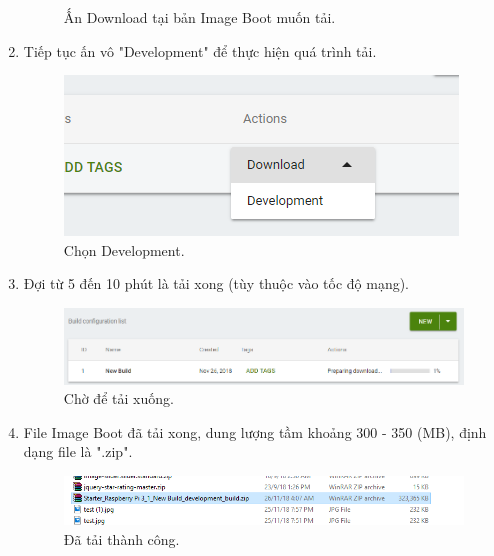 \begin{enumerate}
\begin{center}
\begin{figure}[htp]
\begin{center}
\end{center}
\caption{Ấn Download tại bản Image Boot muốn tải.}
\label{refhinh1}
\end{figure}
\end{center}
\newpage
\item Tiếp tục ấn vô "Development" để thực hiện quá trình tải.
\begin{center}
\begin{figure}[htp]
\begin{center}
\includegraphics[scale=0.7]{image3/sat18.png}
\end{center}
\caption{Chọn Development.}
\label{refhinh1}
\end{figure}
\end{center}
\item Đợi từ 5 đến 10 phút là tải xong (tùy thuộc vào tốc độ mạng).
\begin{center}
\begin{figure}[htp]
\begin{center}
\includegraphics[scale=0.6]{image3/sat19.png}
\end{center}
\caption{Chờ để tải xuống.}
\label{refhinh1}
\end{figure}
\end{center}
\item File Image Boot đã tải xong, dung lượng tầm khoảng 300 - 350 (MB), định dạng file là ".zip".
\begin{center}
\begin{figure}[htp]
\begin{center}
\includegraphics[scale=0.75]{image3/sat20.png}
\end{center}
\caption{Đã tải thành công.}
\label{refhinh1}
\end{figure}
\end{center}
\end{enumerate}
